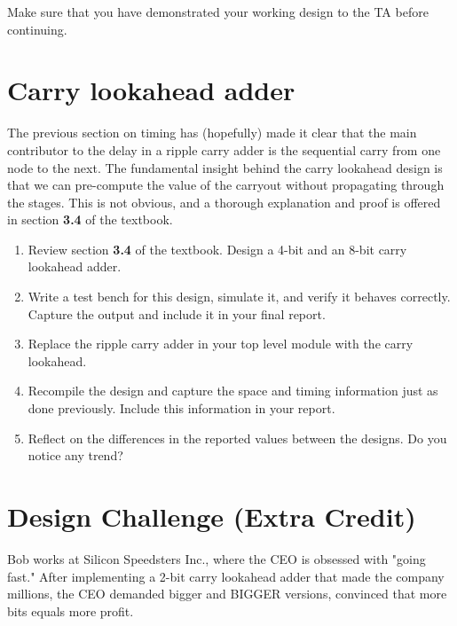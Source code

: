 \documentclass[12pt]{betterjournal}
\begin{document}
\hfill\break

\begin{important}[frametitle={TA Checkoff}]
    Make sure that you have demonstrated your working design to the TA before continuing.
\end{important}



\section{Carry lookahead adder}
The previous section on timing has (hopefully) made it clear that the main contributor to the delay in a ripple carry adder is the sequential carry from one node to the next. The fundamental insight behind the carry lookahead design is that we can pre-compute the value of the carryout without propagating through the stages. This is not obvious, and a thorough explanation and proof is offered in section \textbf{3.4} of the textbook.
\hfill\break
\begin{question}
\begin{enumerate}
    \item Review section \textbf{3.4} of the textbook. Design a 4-bit and an 8-bit carry lookahead adder.
    \item Write a test bench for this design, simulate it, and verify it behaves correctly. Capture the output and include it in your final report.
    \item Replace the ripple carry adder in your top level module with the carry lookahead.
    \item Recompile the design and capture the space and timing information just as done previously. Include this information in your report.
    \item Reflect on the differences in the reported values between the designs. Do you notice any trend?
\end{enumerate}
    
\end{question}


\section{Design Challenge (Extra Credit)}
Bob works at Silicon Speedsters Inc., where the CEO is obsessed with "going fast." After implementing a 2-bit carry lookahead adder that made the company millions, the CEO demanded bigger and BIGGER versions, convinced that more bits equals more profit.
\end{document}
